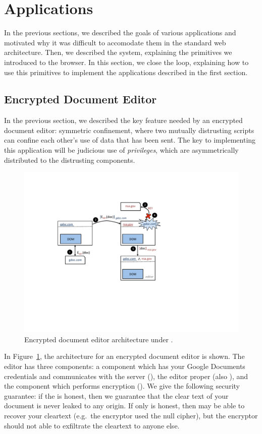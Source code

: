 \section{Applications}
\label{sec:apps}

In the previous sections, we described the goals of various applications
and motivated why it was difficult to accomodate them in the standard
web architecture.  Then, we described the \sys{} system, explaining the
primitives we introduced to the browser.  In this section, we close the
loop, explaining how to use this primitives to implement the
applications described in the first section.

\subsection{Encrypted Document Editor}

In the previous section, we described the key feature needed by an
encrypted document editor: symmetric confinement, where two mutually
distrusting scripts can confine each other's use of data that has been
sent.  The key to implementing this application will be judicious use of
\emph{privileges}, which are asymmetrically distributed to the
distrusting components.

\begin{figure}
\centerline{\includegraphics[width=\columnwidth]{editor}}
\caption{\label{fig:editor} Encrypted document editor architecture
under \sys{}.}
\end{figure}

In Figure~\ref{fig:editor}, the architecture for an encrypted document
editor is shown.  The editor has three components: a component which has
your Google Documents credentials and communicates with the server (), the
editor proper (also ), and the component which performs encryption ().  We give the
following security guarantee: if the  is honest, then we
guarantee that the clear text of your document is never leaked to any
origin.  If only  is honest, then  may
be able to recover your cleartext (e.g.\ the encryptor used the null
cipher), but the encryptor should not able to exfiltrate the cleartext
to anyone else.

